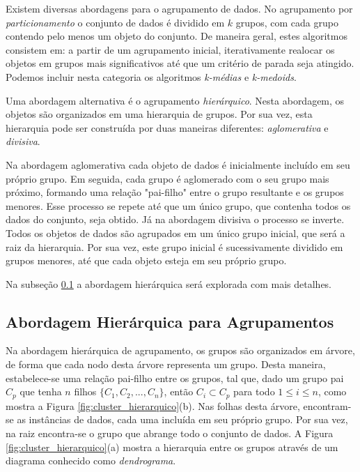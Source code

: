 Existem diversas abordagens para o agrupamento de dados. No agrupamento por
\emph{particionamento} o conjunto de dados é dividido em $k$ grupos, com cada 
grupo contendo pelo menos um objeto do conjunto. De maneira geral, estes
algoritmos consistem em: a partir de um agrupamento inicial, iterativamente 
realocar os objetos em grupos mais significativos até que um critério de parada
seja atingido. Podemos incluir nesta categoria os algoritmos \emph{k-médias} e
\emph{k-medoids}.

Uma abordagem alternativa é o agrupamento \emph{hierárquico}. Nesta abordagem, 
os objetos são organizados em uma hierarquia de grupos. Por sua vez, esta
hierarquia pode ser construída por duas maneiras diferentes:
\emph{aglomerativa} e \emph{divisiva}.

Na abordagem aglomerativa cada objeto de dados é inicialmente incluído em seu
próprio grupo. Em seguida, cada grupo é aglomerado com o seu grupo mais próximo,
formando uma relação "pai-filho" entre o grupo resultante e os grupos menores.
Esse processo se repete até que um único grupo, que contenha todos os dados do 
conjunto, seja obtido. Já na abordagem divisiva o processo se inverte. Todos os
objetos de dados são agrupados em um único grupo inicial, que será a raiz da 
hierarquia. Por sua vez, este grupo inicial é sucessivamente dividido em grupos
menores, até que cada objeto esteja em seu próprio grupo.

Na subseção \ref{subsec:abordagem_hierarquica} a abordagem hierárquica será
explorada com mais detalhes.

\subsection{Abordagem Hierárquica para Agrupamentos}
	\label{subsec:abordagem_hierarquica}
	
Na abordagem hierárquica de agrupamento, os grupos são organizados em árvore, de
forma que cada nodo desta árvore representa um grupo. Desta maneira,
estabelece-se uma relação pai-filho entre os grupos, tal que, dado um grupo pai
$C_p$ que tenha $n$ filhos $\{C_1, C_2,...,C_n\}$, então $C_i \subset C_p$ para
todo $1 \leq i \leq n$, como mostra a Figura \ref{fig:cluster_hierarquico}(b).
Nas folhas desta árvore, encontram-se as instâncias de dados, cada uma incluída
em seu próprio grupo. Por sua vez, na raiz encontra-se o grupo que abrange todo
o conjunto de dados. A Figura \ref{fig:cluster_hierarquico}(a) mostra a
hierarquia entre os grupos através de um diagrama conhecido como
\emph{dendrograma}.


